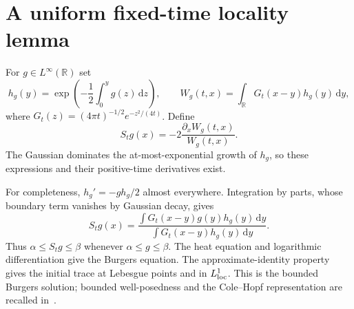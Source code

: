 \documentclass[11pt,a4paper]{article}
\numberwithin{equation}{section}
\theoremstyle{remark}\newtheorem{remark}[theorem]{Remark}
\newcommand{\R}{\mathbb R}\newcommand{\C}{\mathbb C}\newcommand{\T}{\mathbb T}
\newcommand{\dd}{\,\mathrm d}
\begin{document}
\section{A uniform fixed-time locality lemma}
For $g\in L^\infty(\R)$ set
\[
 h_g(y)=\exp\left(-\frac12\int_0^y g(z)\dd z\right),\qquad
 W_g(t,x)=\int_\R G_t(x-y)h_g(y)\dd y,
\]
where $G_t(z)=(4\pi t)^{-1/2}e^{-z^2/(4t)}$. Define
\begin{equation}\label{eq:semigroup}
 S_tg(x)=-2\frac{\partial_xW_g(t,x)}{W_g(t,x)}.
\end{equation}
The Gaussian dominates the at-most-exponential growth of $h_g$, so these expressions and their positive-time derivatives exist.

For completeness, $h_g'=-g h_g/2$ almost everywhere. Integration by parts, whose boundary term vanishes by Gaussian decay, gives
\begin{equation}\label{eq:average}
 S_tg(x)=\frac{\int G_t(x-y)g(y)h_g(y)\dd y}
 {\int G_t(x-y)h_g(y)\dd y}.
\end{equation}
Thus $\alpha\leq S_tg\leq\beta$ whenever $\alpha\leq g\leq\beta$. The heat equation and logarithmic differentiation give the Burgers equation. The approximate-identity property gives the initial trace at Lebesgue points and in $L^1_{\rm loc}$. This is the bounded Burgers solution; bounded well-posedness and the Cole--Hopf representation are recalled in~\cite{gs,hopf,cole}.
\end{document}
